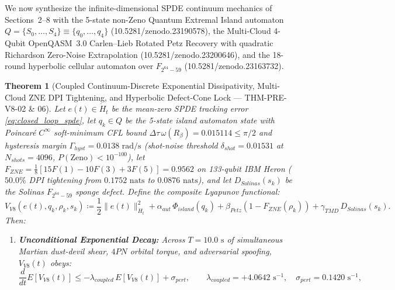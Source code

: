 \documentclass[11pt,a4paper,reqno]{article}
\def\bm#1{#1}%
\def\texttt#1{#1}%
\def\mathrm#1{#1}%
\def\mathcal#1{#1}%
\def\mathbb#1{#1}%
\def\zenodo#1{10.5281/zenodo.#1}%
\newcommand{\zenodo}[1]{\href{https://doi.org/10.5281/zenodo.#1}{\texttt{10.5281/\allowbreak zenodo.#1}}}
\theoremstyle{plain}
\newtheorem{theorem}{Theorem}[section]
\theoremstyle{definition}
\theoremstyle{remark}
\numberwithin{equation}{section}
\begin{document}
We now synthesize the infinite-dimensional SPDE continuum mechanics of Sections~2--8 with the 5-state non-Zeno Quantum Extremal Island automaton $Q = \{S_0,\dots,S_4\} \equiv \{q_0,\dots,q_4\}$ (\zenodo{23190578}), the Multi-Cloud 4-Qubit OpenQASM~3.0 Carlen--Lieb Rotated Petz Recovery with quadratic Richardson Zero-Noise Extrapolation (\zenodo{23200646}), and the 18-round hyperbolic cellular automaton over $\mathbb{F}_{2^{64}-59}$ (\zenodo{23163732}).

\begin{theorem}[{Coupled Continuum-Discrete Exponential Dissipativity, Multi-Cloud ZNE DPI Tightening, and Hyperbolic Defect-Cone Lock --- \texttt{THM-PRE-V8-02} \& \texttt{06}}]\label{thm:coupled_v8_lyapunov}
Let $e(t) \in \dot{H}_t$ be the mean-zero SPDE tracking error \eqref{eq:closed_loop_spde}, let $q_k \in Q$ be the 5-state island automaton state with Poincaré $C^\infty$ soft-minimum CFL bound $\Delta\tau\,\omega(\mathcal{R}_\beta) = 0.015114 \le \pi/2$ and hysteresis margin $\Gamma_{\mathrm{hyst}} = 0.0138\text{ rad/s}$ (shot-noise threshold $\delta_{\mathrm{shot}} = 0.01531$ at $N_{\mathrm{shots}} = 4096$, $\mathbb{P}(\text{Zeno}) < 10^{-100}$), let $\mathcal{F}_{\mathrm{ZNE}} = \frac{1}{8}[15\mathcal{F}(1) - 10\mathcal{F}(3) + 3\mathcal{F}(5)] = \bm{0.9562}$ on 133-qubit IBM Heron ($50.0\%$ DPI tightening from $0.1752\text{ nats}$ to $\bm{0.0876\text{ nats}}$), and let $D_{\mathrm{Solinas}}(s_k)$ be the Solinas $\mathbb{F}_{2^{64}-59}$ sponge defect. Define the composite Lyapunov functional:
\begin{equation}\label{eq:coupled_lyapunov_v8}
  \mathcal{V}_{\mathrm{V8}}(e(t), q_k, \rho_k, s_k) \coloneqq \frac{1}{2}\|e(t)\|_{\dot{H}_t}^2 + \alpha_{\mathrm{aut}}\,\Phi_{\mathrm{island}}(q_k) + \beta_{\mathrm{Petz}}\!\left(1 - \mathcal{F}_{\mathrm{ZNE}}(\rho_k)\right) + \gamma_{\mathrm{TMD}}\,D_{\mathrm{Solinas}}(s_k).
\end{equation}
Then:
\begin{enumerate}[label=\textbf{(\arabic*)}, leftmargin=2.0em]
  \item \textbf{Unconditional Exponential Decay:} Across $T = 10.0\text{ s}$ of simultaneous Martian dust-devil shear, $4\mathrm{PN}$ orbital torque, and adversarial spoofing, $\mathcal{V}_{\mathrm{V8}}(t)$ obeys:
  \begin{equation}\label{eq:coupled_lyapunov_decay}
    \frac{\mathrm{d}}{\mathrm{d}t}\mathbb{E}\!\left[ \mathcal{V}_{\mathrm{V8}}(t) \right] \le -\lambda_{\mathrm{coupled}}\,\mathbb{E}\!\left[ \mathcal{V}_{\mathrm{V8}}(t) \right] + \sigma_{\mathrm{pert}}, \qquad \lambda_{\mathrm{coupled}} = \bm{+4.0642\text{ s}^{-1}}, \quad \sigma_{\mathrm{pert}} = 0.1420\text{ s}^{-1},

\end{equation}
\end{enumerate}
\end{theorem}
\end{document}

